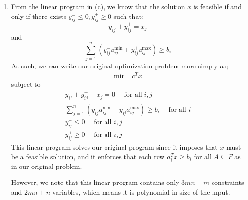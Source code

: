 \documentclass[12pt]{exam}
\begin{document}
\begin{questions}
\begin{solution}
\begin{enumerate}[label=(\alph*)]
  \item
    From the linear program in (c), we know that the solution $x$ is feasible if and only if there exists $y_{ij}^- \leq 0, y_{ij}^+ \geq 0$ such that:
    \[
      y_{ij}^- + y_{ij}^+ = x_j
    \]
    and 
    \[
      \sum_{j=1}^n (y^{-}_{ij} a^{\min}_{ij} + y_{ij}^{+}a_{ij}^{\max}) \geq b_i
    \]
    As such, we can write our original optimization problem more simply as;
    \begin{align}
      \text{min} \quad c^Tx 
    \end{align}
    subject to
    \begin{align}
      y_{ij}^- + y_{ij}^+ - x_j = 0 \quad \text{ for all } i,j\\
      \sum_{j=1}^n (y^{-}_{ij} a^{\min}_{ij} + y_{ij}^{+}a_{ij}^{\max}) \geq b_i \quad \text{ for all } i \\
      y_{ij}^- \leq 0 \quad \text{ for all } i,j \\
      y_{ij}^+ \geq 0 \quad \text{ for all } i,j
    \end{align}
    This linear program solves our original program since it imposes that $x$ must be a feasible solution, and it enforces that each row $a_i^Tx \geq b_i$ for all $A \subseteq F$ as in our original problem.


    However, we note that this linear program contains only $3mn + m$ constraints and $2mn + n$ variables, which means it is polynomial in size of the input.
  \end{enumerate}
\end{solution}

\end{questions}
\end{document}
